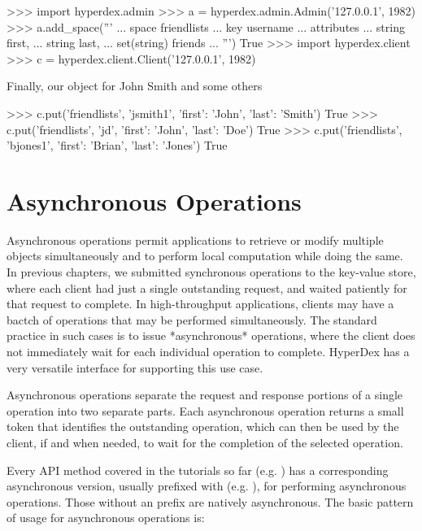 \begin{pythoncode}
>>> import hyperdex.admin
>>> a = hyperdex.admin.Admin('127.0.0.1', 1982)
>>> a.add_space('''
... space friendlists
... key username
... attributes
...    string first,
...    string last,
...    set(string) friends
... ''')
True
>>> import hyperdex.client
>>> c = hyperdex.client.Client('127.0.0.1', 1982)
\end{pythoncode}

Finally, our object for John Smith and some others

\begin{pythoncode}
>>> c.put('friendlists', 'jsmith1', {'first': 'John', 'last': 'Smith'})
True
>>> c.put('friendlists', 'jd', {'first': 'John', 'last': 'Doe'})
True
>>> c.put('friendlists', 'bjones1', {'first': 'Brian', 'last': 'Jones'})
True
\end{pythoncode}

\section{Asynchronous Operations}
\label{sec:async-ops:ops}

Asynchronous operations permit applications to retrieve or modify multiple
objects simultaneously and to perform local computation while doing the same.
In previous chapters, we submitted synchronous operations to the key-value
store, where each client had just a single outstanding request, and waited
patiently for that request to complete.  In high-throughput applications,
clients may have a bactch of operations that may be performed simultaneously.
The standard practice in such cases is to issue *asynchronous* operations, where
the client does not immediately wait for each individual operation to complete.
HyperDex has a very versatile interface for supporting this use case.

Asynchronous operations separate the request and response portions of a single
operation into two separate parts.  Each asynchronous operation returns a small
token that identifies the outstanding operation, which can then be used by the
client, if and when needed, to wait for the completion of the selected
operation.

Every API method covered in the tutorials so far (e.g. ) has a
corresponding asynchronous version, usually prefixed with  (e.g.
), for performing asynchronous operations.  Those without an
 prefix are natively asynchronous.  The basic pattern of usage for
asynchronous operations is:

